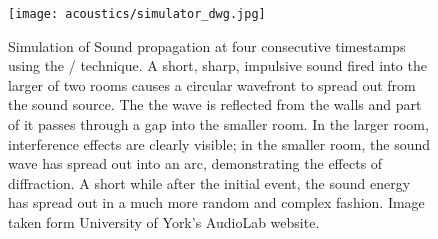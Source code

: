 \begin{figure}[t]
    \begin{fullwidth}
        \centering
        \texttt{[image: acoustics/simulator\_dwg.jpg]}

        \caption{Simulation of Sound propagation at four consecutive timestamps using the \DWM/ technique.
        A short, sharp, impulsive sound fired into the larger of two rooms causes a circular wavefront to spread out from the sound source.
        The the wave is reflected from the walls and part of it passes through a gap into the smaller room.
        In the larger room, interference effects are clearly visible;
        in the smaller room, the sound wave has spread out into an arc, demonstrating the effects of diffraction.
        A short while after the initial event, the sound energy has spread out in a much more random and complex fashion.
        Image taken form University of York's AudioLab website.
        }
        \label{fig:acoustics:dwm}
    \end{fullwidth}

\end{figure}






